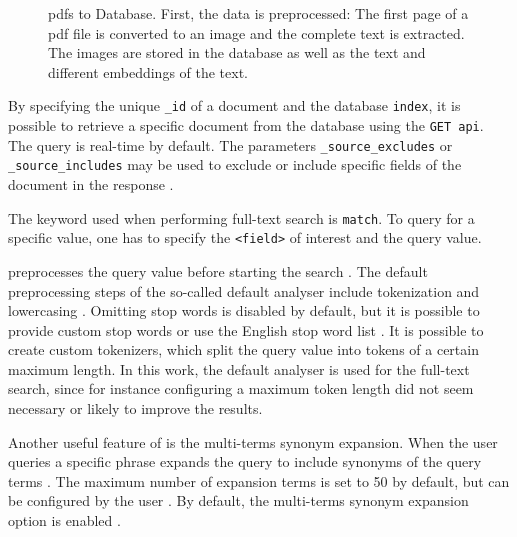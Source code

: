\begin{figure}[htp] %
    \centering
    
    \caption{\acp{pdf} to Database. 
    First, the data is preprocessed:
    The first page of a \ac{pdf} file is converted to an image and the complete text is extracted. 
    The images are stored in the database as well as the text and different embeddings of the text.
    }
    \label{fig:pdf2db}
\end{figure}

By specifying the unique \texttt{\_id} of a document and the database \texttt{index}, it is possible to retrieve a specific document from the database using the \texttt{GET \ac{api}}.
The query is real-time by default.
The parameters \texttt{\_source\_excludes} or \texttt{\_source\_includes} may be used to exclude or include specific fields of the document in the response \cite{Elasticsearch-get}.

The keyword used when performing full-text search is \texttt{match}.
To query for a specific value, one has to specify the \texttt{<field>} of interest and the query value.

\databaseName{} preprocesses the query value before starting the search \cite{Elasticsearch-text-analyser}.
The default preprocessing steps of the so-called default analyser include tokenization and lowercasing \cite{Elasticsearch-standard-analyser}. 
Omitting stop words is disabled by default, but it is possible to provide custom stop words or use the English stop word list \cite{Elasticsearch-standard-analyser}.
It is possible to create custom tokenizers, which split the query value into tokens of a certain maximum length.
In this work, the default analyser is used for the full-text search, since for instance configuring a maximum token length did not seem necessary or likely to improve the results.

Another useful feature of \databaseName{} is the multi-terms synonym expansion.
When the user queries a specific phrase \databaseName{} expands the query to include synonyms of the query terms \cite{Elasticsearch-synonyms}.
The maximum number of expansion terms is set to 50 by default, but can be configured by the user \cite{Elasticsearch-match}.
By default, the multi-terms synonym expansion option is enabled \cite{Elasticsearch-match}.

